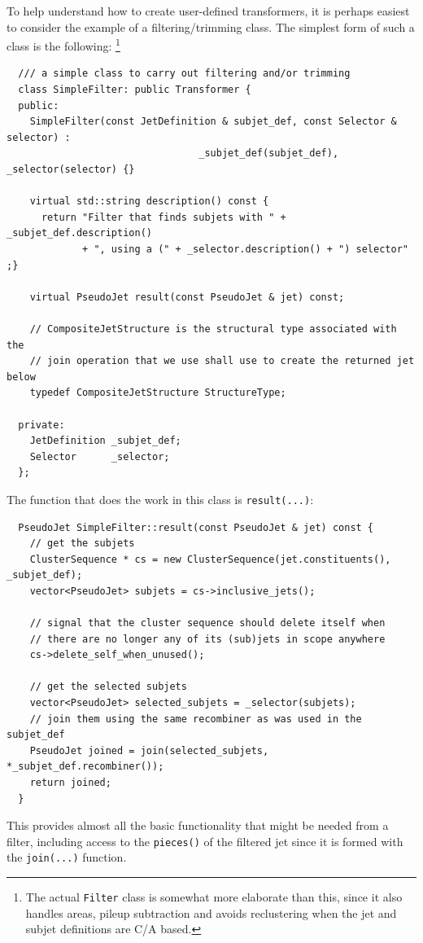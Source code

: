\documentclass[12pt,a4]{article}
\newcommand{\ttt}[1]{{\small\texttt{#1}}}
\begin{document}
To help understand how to create user-defined transformers, it is
perhaps easiest to consider the example of a filtering/trimming class.
%
The simplest form of such a class is the following:%
\footnote{The actual \texttt{Filter} class is somewhat more elaborate
  than this, since it also handles areas, pileup subtraction and avoids
  reclustering when the jet and subjet definitions are C/A based.}
%
\begin{lstlisting}
  /// a simple class to carry out filtering and/or trimming
  class SimpleFilter: public Transformer {
  public:
    SimpleFilter(const JetDefinition & subjet_def, const Selector & selector) :
                                 _subjet_def(subjet_def), _selector(selector) {}
  
    virtual std::string description() const {
      return "Filter that finds subjets with " + _subjet_def.description()
             + ", using a (" + _selector.description() + ") selector" ;}
     
    virtual PseudoJet result(const PseudoJet & jet) const;
   
    // CompositeJetStructure is the structural type associated with the 
    // join operation that we use shall use to create the returned jet below
    typedef CompositeJetStructure StructureType;
   
  private:
    JetDefinition _subjet_def;
    Selector      _selector;
  };
\end{lstlisting}
The function that does the work in this class is \ttt{result(...)}:
%
\begin{lstlisting}
  PseudoJet SimpleFilter::result(const PseudoJet & jet) const {
    // get the subjets
    ClusterSequence * cs = new ClusterSequence(jet.constituents(), _subjet_def);
    vector<PseudoJet> subjets = cs->inclusive_jets();
     
    // signal that the cluster sequence should delete itself when
    // there are no longer any of its (sub)jets in scope anywhere
    cs->delete_self_when_unused();
     
    // get the selected subjets 
    vector<PseudoJet> selected_subjets = _selector(subjets);
    // join them using the same recombiner as was used in the subjet_def
    PseudoJet joined = join(selected_subjets, *_subjet_def.recombiner());
    return joined;
  }
\end{lstlisting}
This provides almost all the basic functionality that might be needed
from a filter, including access to the \ttt{pieces()} of the filtered
jet since it is formed with the \ttt{join(...)} function.
\end{document}
